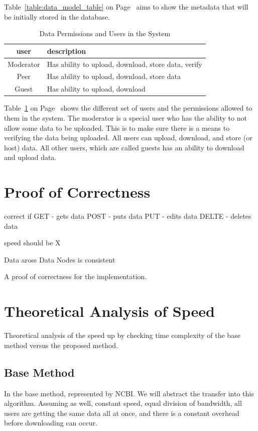 \documentclass[acmsmall]{acmart}
\begin{document}
Table~\ref{table:data_model_table} on Page~\pageref{table:data_model_table} aims to show the metadata that will be initially stored in the database.


\begin{table}[h]
\caption{Data Permissions and Users in the System}
\label{table:data_perm_table}
\begin{tabular}{cl}
    \toprule
    user & description \\
    \midrule
   Moderator & Has ability to upload, download, store data, verify \\
    Peer & Has ability to upload, download, store data \\
    Guest & Has ability to upload, download \\
   \bottomrule 
\end{tabular}
\end{table}

Table~\ref{table:data_perm_table} on Page~\pageref{table:data_perm_table} shows the different set of users and the permissions allowed to them in the system. The moderator is a special user who has the ability to not allow some data to be uploaded. This is to make sure there is a means to verifying the data being uploaded. All users can upload, download, and store (or host) data. All other users, which are called guests has an ability to download and upload data.


\section{Proof of Correctness}
correct if
GET - gets data
POST - puts data
PUT - edits data
DELTE - deletes data

speed should be X

Data aross Data Nodes is consistent

A proof of correctness for the implementation.

\section{Theoretical Analysis of Speed}

Theoretical analysis of the speed up by checking time complexity of the base method versus the proposed method.

\subsection{Base Method}
In the base method, represented by NCBI. We will abstract the transfer into this algorithm. Assuming as well, constant speed, equal division of bandwidth, all users are getting the same data all at once, and there is a constant overhead before downloading can occur.
\end{document}
